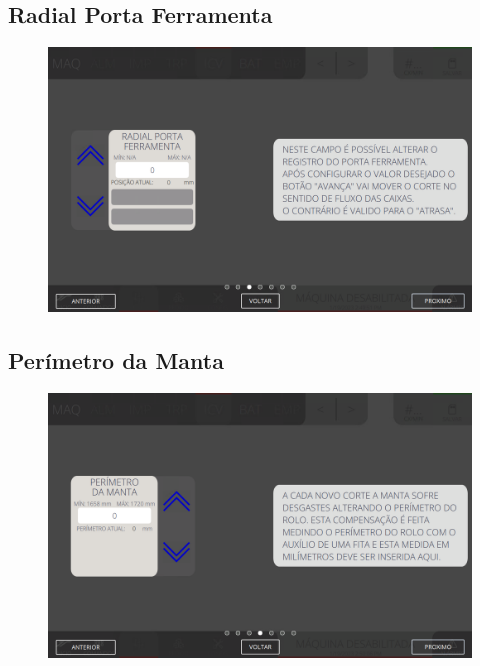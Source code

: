\newpage
\thispagestyle{fancy}
\vspace*{40 pt}
\subsection{Radial Porta Ferramenta}
\vspace*{\fill}
\begin{figure}[h]
    \centering
    \includegraphics[width=480 px,height=300 px]{src/imagesICV/06-dryCutter/settings/e-3.png}
\end{figure}
\vspace*{\fill}

\newpage
\thispagestyle{fancy}
\vspace*{40 pt}
\subsection{Perímetro da Manta}
\vspace*{\fill}
\begin{figure}[h]
    \centering
    \includegraphics[width=576 px,height=360 px]{src/imagesICV/06-dryCutter/settings/e-4.png}
\end{figure}
\vspace*{\fill}

